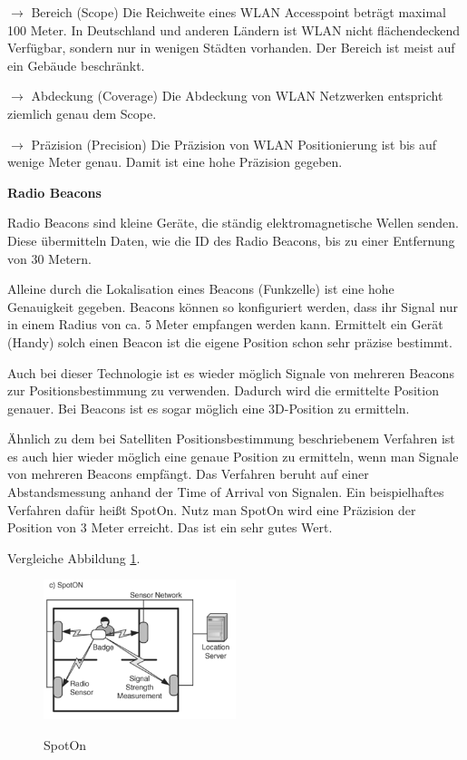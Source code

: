 \cite[S. 209-211]{Schiller2004}

$\longrightarrow$ Bereich (Scope) Die Reichweite eines WLAN Accesspoint beträgt maximal 100 Meter. In Deutschland und anderen Ländern ist WLAN nicht flächendeckend Verfügbar, sondern nur in wenigen Städten vorhanden. Der Bereich ist meist auf ein Gebäude beschränkt.

$\longrightarrow$ Abdeckung (Coverage) Die Abdeckung von WLAN Netzwerken entspricht ziemlich genau dem Scope. 

$\longrightarrow$ Präzision (Precision) Die Präzision von WLAN Positionierung ist bis auf wenige Meter genau. Damit ist eine hohe Präzision gegeben.

\textbf{Radio Beacons} \label{sec:radio}

Radio Beacons sind kleine Geräte, die ständig elektromagnetische Wellen senden. Diese übermitteln Daten, wie die ID des Radio Beacons, bis zu einer Entfernung von 30 Metern.

Alleine durch die Lokalisation eines Beacons (Funkzelle) ist eine hohe Genauigkeit gegeben. Beacons können so konfiguriert werden, dass ihr Signal nur in einem Radius von ca. 5 Meter empfangen werden kann. Ermittelt ein Gerät (Handy) solch einen Beacon ist die eigene Position schon sehr präzise bestimmt.

Auch bei dieser Technologie ist es wieder möglich Signale von mehreren Beacons zur Positionsbestimmung zu verwenden. Dadurch wird die ermittelte Position genauer. Bei Beacons ist es sogar möglich eine 3D-Position zu ermitteln.

Ähnlich zu dem bei Satelliten Positionsbestimmung beschriebenem Verfahren ist es auch hier wieder möglich eine genaue Position zu ermitteln, wenn man Signale von mehreren Beacons empfängt. Das Verfahren beruht auf einer Abstandsmessung anhand der Time of Arrival von Signalen. Ein beispielhaftes Verfahren dafür heißt SpotOn.
Nutz man SpotOn wird eine Präzision der Position von 3 Meter erreicht. Das ist ein sehr gutes Wert.

\cite[S. 201 - 204]{Schiller2004}

Vergleiche Abbildung \ref{fig:SpotOn}.

\begin{figure}[h]
\centering
\includegraphics[width=0.5\textwidth]{ref/images/SpotOn.PNG}
\caption[SpotOn]{SpotOn}
\label{fig:SpotOn}
\cite[S. 201]{Schiller2004}
\end{figure}


